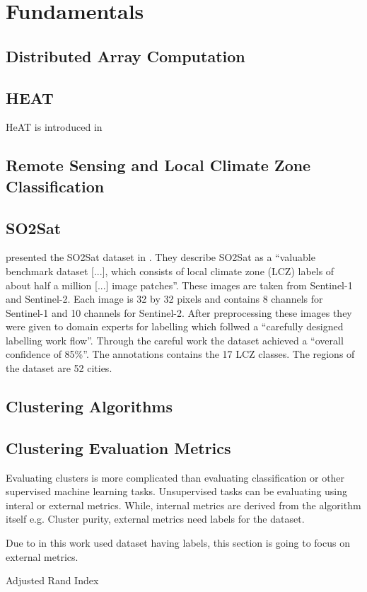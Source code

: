 \section{Fundamentals}
\label{sec:fundamentals}

\subsection{Distributed Array Computation}
\label{ssec:distributed_array_computation}


\subsection{HEAT}
\label{ssec:heat}
\gls{HeAT} is introduced in \cite{krajsek_helmholtz_nodate}

\subsection{Remote Sensing and Local Climate Zone Classification}
\label{ssec:remote_sensing_and_local_climate_zone_classification}

\subsection{SO2Sat}
\citeauthor{zhu_so2sat_2019} presented the SO2Sat dataset in \cite{zhu_so2sat_2019}. They describe SO2Sat as a \enquote{valuable benchmark dataset [...], which consists of local climate zone (LCZ) labels of about half a million [...] image patches}.
These images are taken from Sentinel-1 and Sentinel-2. Each image is 32 by 32 pixels and contains 8 channels for Sentinel-1 and 10 channels for Sentinel-2.
After preprocessing these images they were given to domain experts for labelling which follwed a \enquote{carefully designed labelling work flow}.
Through the careful work the dataset achieved a \enquote{overall confidence of 85\%}.
The annotations contains the 17 LCZ classes.
The regions of the dataset are 52 cities.

\subsection{Clustering Algorithms}
\label{ssec:clustering_algorithms}


\subsection{Clustering Evaluation Metrics}
\label{ssec:clustering_evaluation_metrics}

Evaluating clusters is more complicated than evaluating classification or other supervised machine learning tasks.
Unsupervised tasks can be evaluating using interal or external metrics. While, internal metrics are derived from the algorithm itself e.g. Cluster purity, external metrics need labels for the dataset.

Due to in this work used dataset having labels, this section is going to focus on external metrics.

Adjusted Rand Index
